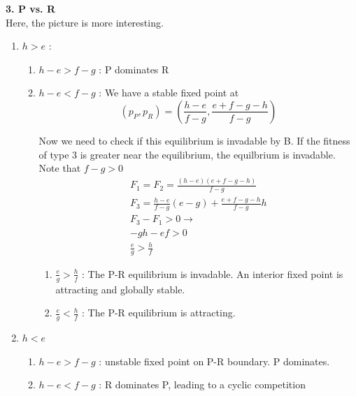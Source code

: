 \documentclass[12pt]{report}
\begin{document}
\textbf{3. P vs. R} \\
Here, the picture is more interesting. 

\begin{enumerate}
	\item $h > e$ : 
	\begin{enumerate}
		\item $h - e > f - g$ : P dominates R
		\item $h - e < f - g$ : We have a stable fixed point at 
		$$(p_P, p_R) = (\frac{h - e}{f-g}, \frac{e + f - g- h}{f -g})$$ 
		
		 Now we need to check if this equilibrium is invadable by B. If the fitness of type 3 is greater near the equilibrium, the equilbrium is invadable. Note that $f - g > 0$
		\begin{gather*}
		F_1 = F_2 = \frac{(h - e)(e + f  - g - h)}{f - g} \\
		F_3 = \frac{h- e}{f-g} (e - g) + \frac{e + f - g - h}{f - g} h \\
		F_3 - F_1 > 0 \rightarrow \\
		- g h - ef > 0 \\
		\frac{e}{g} > \frac{h}{f}
		\end{gather*}
		
		\begin{enumerate}
			\item $\frac{e}{g} > \frac{h}{f}$ : The P-R equilibrium is invadable. An interior fixed point is attracting and globally stable.
			\item  $\frac{e}{g} < \frac{h}{f}$ : The P-R equilibrium is attracting.
		\end{enumerate}
	\end{enumerate}
	\item $h < e$
	\begin{enumerate}
		\item $h - e > f -g$  : unstable fixed point on P-R boundary. P dominates.
		\item $h - e < f - g$ : R dominates P, leading to a cyclic competition
	\end{enumerate}
\end{enumerate}
\end{document}
